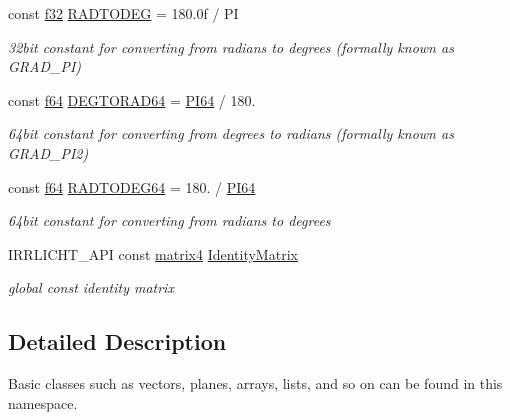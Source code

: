 \begin{DoxyCompactItemize}
const \hyperlink{namespaceirr_a0277be98d67dc26ff93b1a6a1d086b07}{f32} \hyperlink{namespaceirr_1_1core_ae3a530e0ef661960b7af89f07d817bd5}{R\+A\+D\+T\+O\+D\+EG} = 180.\+0f / PI
\begin{DoxyCompactList}\small\item\em 32bit constant for converting from radians to degrees (formally known as G\+R\+A\+D\+\_\+\+PI) \end{DoxyCompactList}\item 
\mbox{\label{namespaceirr_1_1core_a8e21b5969c8292857f7c9c5dcfd61c35}} 
const \hyperlink{namespaceirr_a1325b02603ad449f92c68fc640af9b28}{f64} \hyperlink{namespaceirr_1_1core_a8e21b5969c8292857f7c9c5dcfd61c35}{D\+E\+G\+T\+O\+R\+A\+D64} = \hyperlink{namespaceirr_1_1core_a166af519140dc00cbd88684e835086f8}{P\+I64} / 180.
\begin{DoxyCompactList}\small\item\em 64bit constant for converting from degrees to radians (formally known as G\+R\+A\+D\+\_\+\+P\+I2) \end{DoxyCompactList}\item 
\mbox{\label{namespaceirr_1_1core_ae7afeb48af12f5f5130cd179a644ec58}} 
const \hyperlink{namespaceirr_a1325b02603ad449f92c68fc640af9b28}{f64} \hyperlink{namespaceirr_1_1core_ae7afeb48af12f5f5130cd179a644ec58}{R\+A\+D\+T\+O\+D\+E\+G64} = 180. / \hyperlink{namespaceirr_1_1core_a166af519140dc00cbd88684e835086f8}{P\+I64}
\begin{DoxyCompactList}\small\item\em 64bit constant for converting from radians to degrees \end{DoxyCompactList}\item 
\mbox{\label{namespaceirr_1_1core_ac4561f3920d3fbfbfff74c9bed1f2713}} 
I\+R\+R\+L\+I\+C\+H\+T\+\_\+\+A\+PI const \hyperlink{namespaceirr_1_1core_a73fa92e638c5ca97efd72da307cc9b65}{matrix4} \hyperlink{namespaceirr_1_1core_ac4561f3920d3fbfbfff74c9bed1f2713}{Identity\+Matrix}
\begin{DoxyCompactList}\small\item\em global const identity matrix \end{DoxyCompactList}\end{DoxyCompactItemize}


\subsection{Detailed Description}
Basic classes such as vectors, planes, arrays, lists, and so on can be found in this namespace. 

